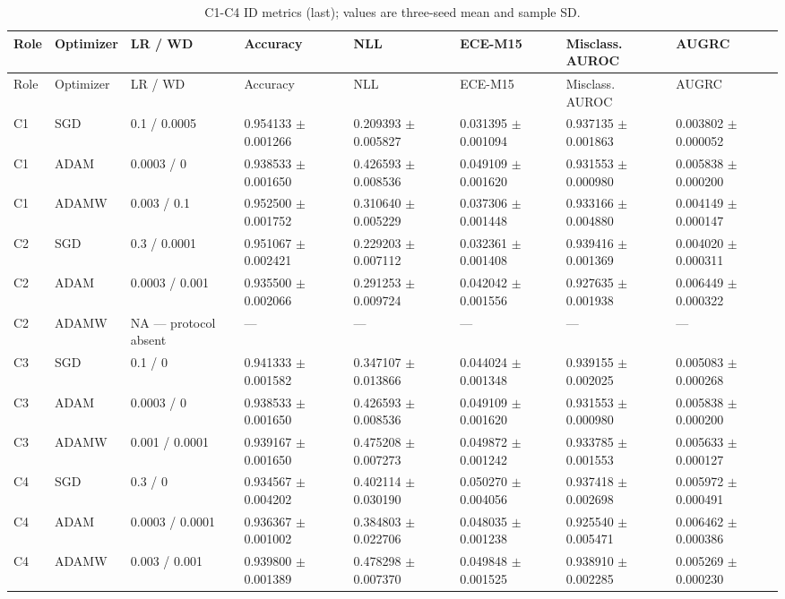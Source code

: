 \begin{longtable}{llllllll}
\caption{C1-C4 ID metrics (last); values are three-seed mean and sample SD.}\\
Role & Optimizer & LR / WD & Accuracy & NLL & ECE-M15 & Misclass. AUROC & AUGRC \\
\hline
\endfirsthead
Role & Optimizer & LR / WD & Accuracy & NLL & ECE-M15 & Misclass. AUROC & AUGRC \\
\hline
\endhead
C1 & SGD & 0.1 / 0.0005 & 0.954133 $\pm$ 0.001266 & 0.209393 $\pm$ 0.005827 & 0.031395 $\pm$ 0.001094 & 0.937135 $\pm$ 0.001863 & 0.003802 $\pm$ 0.000052 \\
C1 & ADAM & 0.0003 / 0 & 0.938533 $\pm$ 0.001650 & 0.426593 $\pm$ 0.008536 & 0.049109 $\pm$ 0.001620 & 0.931553 $\pm$ 0.000980 & 0.005838 $\pm$ 0.000200 \\
C1 & ADAMW & 0.003 / 0.1 & 0.952500 $\pm$ 0.001752 & 0.310640 $\pm$ 0.005229 & 0.037306 $\pm$ 0.001448 & 0.933166 $\pm$ 0.004880 & 0.004149 $\pm$ 0.000147 \\
C2 & SGD & 0.3 / 0.0001 & 0.951067 $\pm$ 0.002421 & 0.229203 $\pm$ 0.007112 & 0.032361 $\pm$ 0.001408 & 0.939416 $\pm$ 0.001369 & 0.004020 $\pm$ 0.000311 \\
C2 & ADAM & 0.0003 / 0.001 & 0.935500 $\pm$ 0.002066 & 0.291253 $\pm$ 0.009724 & 0.042042 $\pm$ 0.001556 & 0.927635 $\pm$ 0.001938 & 0.006449 $\pm$ 0.000322 \\
C2 & ADAMW & NA — protocol absent & — & — & — & — & — \\
C3 & SGD & 0.1 / 0 & 0.941333 $\pm$ 0.001582 & 0.347107 $\pm$ 0.013866 & 0.044024 $\pm$ 0.001348 & 0.939155 $\pm$ 0.002025 & 0.005083 $\pm$ 0.000268 \\
C3 & ADAM & 0.0003 / 0 & 0.938533 $\pm$ 0.001650 & 0.426593 $\pm$ 0.008536 & 0.049109 $\pm$ 0.001620 & 0.931553 $\pm$ 0.000980 & 0.005838 $\pm$ 0.000200 \\
C3 & ADAMW & 0.001 / 0.0001 & 0.939167 $\pm$ 0.001650 & 0.475208 $\pm$ 0.007273 & 0.049872 $\pm$ 0.001242 & 0.933785 $\pm$ 0.001553 & 0.005633 $\pm$ 0.000127 \\
C4 & SGD & 0.3 / 0 & 0.934567 $\pm$ 0.004202 & 0.402114 $\pm$ 0.030190 & 0.050270 $\pm$ 0.004056 & 0.937418 $\pm$ 0.002698 & 0.005972 $\pm$ 0.000491 \\
C4 & ADAM & 0.0003 / 0.0001 & 0.936367 $\pm$ 0.001002 & 0.384803 $\pm$ 0.022706 & 0.048035 $\pm$ 0.001238 & 0.925540 $\pm$ 0.005471 & 0.006462 $\pm$ 0.000386 \\
C4 & ADAMW & 0.003 / 0.001 & 0.939800 $\pm$ 0.001389 & 0.478298 $\pm$ 0.007370 & 0.049848 $\pm$ 0.001525 & 0.938910 $\pm$ 0.002285 & 0.005269 $\pm$ 0.000230 \\
\end{longtable}
